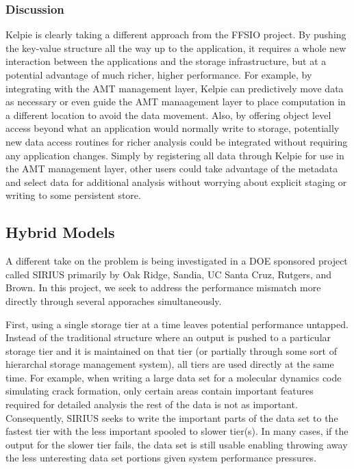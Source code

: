 \subsubsection{Discussion}
Kelpie is clearly taking a different approach from the FFSIO project. By
pushing the key-value structure all the way up to the application, it requires
a whole new interaction between the applications and the storage
infrastructure, but at a potential advantage of much richer, higher
performance. For example, by integrating with the AMT management layer, Kelpie
can predictively move data as necessary or even guide the AMT manaagement layer
to place computation in a different location to avoid the data movement. Also,
by offering object level access beyond what an application would normally write
to storage, potentially new data access routines for richer analysis could be
integrated without requiring any application changes. Simply by registering all
data through Kelpie for use in the AMT management layer, other users could take
advantage of the metadata and select data for additional analysis without
worrying about explicit staging or writing to some persistent store.

\subsection{Hybrid Models}

A different take on the problem is being investigated in a DOE sponsored
project called SIRIUS primarily by Oak Ridge, Sandia, UC Santa Cruz, Rutgers,
and Brown. In this project, we seek to address the performance mismatch more
directly through several apporaches simultaneously.

First, using a single storage tier at a time leaves potential performance
untapped. Instead of the traditional structure where an output is pushed to a
particular storage tier and it is maintained on that tier (or partially through
some sort of hierarchal storage management system), all tiers are used directly
at the same time. For example, when writing a large data set for a molecular
dynamics code simulating crack formation, only certain areas contain important
features required for detailed analysis the rest of the data is not as
important. Consequently, SIRIUS seeks to write the important parts of the data
set to the fastest tier with the less important spooled to slower tier(s). In
many cases, if the output for the slower tier fails, the data set is still
usable enabling throwing away the less unteresting data set portions given
system performance pressures.

